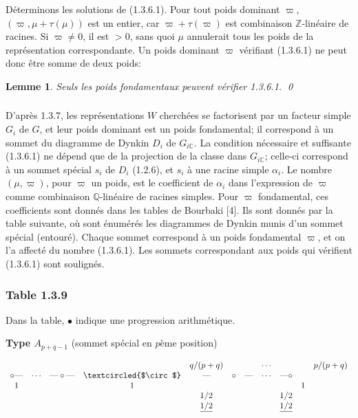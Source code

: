\documentclass[12pt,a4paper]{article}
\theoremstyle{plain}
\newtheorem{lemma}[theorem]{Lemme}
\theoremstyle{definition}
\theoremstyle{remark}
\newcommand{\ZZ}{\mathbb{Z}}
\newcommand{\QQ}{\mathbb{Q}}
\newcommand{\CC}{\mathbb{C}}
\begin{document}
D\'eterminons les solutions de (1.3.6.1). Pour tout poids dominant $\varpi$, $(\varpi, \mu + \tau(\mu))$ est un entier, car $\varpi + \tau(\varpi)$ est combinaison $\ZZ$-lin\'eaire de racines. Si $\varpi \neq 0$, il est $> 0$, sans quoi $\mu$ annulerait tous les poids de la repr\'esentation correspondante. Un poids dominant $\varpi$ v\'erifiant (1.3.6.1) ne peut donc \^etre somme de deux poids:

\begin{lemma}
Seuls les poids fondamentaux peuvent v\'erifier \textup{1.3.6.1}.
\qed
\end{lemma}

\subsubsection{}

D'apr\`es 1.3.7, les repr\'esentations $W$ cherch\'ees se factorisent par un facteur simple $G_i$ de $G$, et leur poids dominant est un poids fondamental; il correspond \`a un sommet du diagramme de Dynkin $D_i$ de $G_{i\CC}$. La condition n\'ecessaire et suffisante (1.3.6.1) ne d\'epend que de la projection de la classe dans $G_{i\CC}$; celle-ci correspond \`a un sommet sp\'ecial $s_i$ de $D_i$ (1.2.6), et $s_i$ \`a une racine simple $\alpha_i$. Le nombre $(\mu,\varpi)$, pour $\varpi$ un poids, est le coefficient de $\alpha_i$ dans l'expression de $\varpi$ comme combinaison $\QQ$-lin\'eaire de racines simples. Pour $\varpi$ fondamental, ces coefficients sont donn\'es dans les tables de Bourbaki [4]. Ils sont donn\'es par la table suivante, o\`u sont \'enum\'er\'es les diagrammes de Dynkin munis d'un sommet sp\'ecial (entour\'e). Chaque sommet correspond \`a un poids fondamental $\varpi$, et on l'a affect\'e du nombre (1.3.6.1). Les sommets correspondant aux poids qui v\'erifient (1.3.6.1) sont soulign\'es.

\subsubsection*{Table 1.3.9}

Dans la table, $\bullet$ indique une progression arithm\'etique.

\begin{center}
\textbf{Type $A_{p+q-1}$} (sommet sp\'ecial en $p$\`eme position)
\end{center}
\[
\begin{array}{ccccccccccccc}
&&&& q/(p+q) &&& \cdots &&& p/(p+q) \\
\circ \text{---} & \cdots & \text{---} \circ \text{---} & \textcircled{$\circ$} & \text{---} & \circ & \text{---} & \cdots & \text{---} \circ \\
1 &&& 1 &&&&&& 1 \\
&&&& 1/2 &&&& 1/2 && \\
&&&& \underline{1/2} &&&& \underline{1/2} &&
\end{array}
\]
\end{document}
